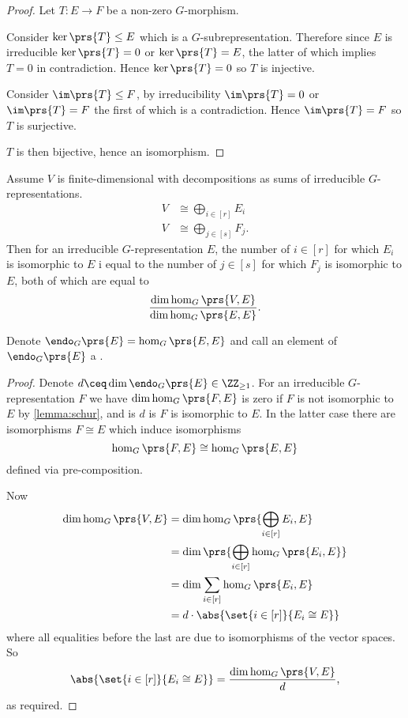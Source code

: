 \documentclass[10pt,a4paper,twoside,openany,hidelinks]{book}
\begin{document}
\begin{proof}
Let $T \colon E \to F$ be a non-zero $G$-morphism.

Consider $\ker\prs{T} \leq E$ which is a $G$-subrepresentation. Therefore since $E$ is irreducible $\ker\prs{T} = 0$ or $\ker\prs{T} = E$, the latter of which implies $T = 0$ in contradiction.
Hence $\ker\prs{T} = 0$ so $T$ is injective.

Consider $\im\prs{T} \leq F$, by irreducibility $\im\prs{T} = 0$ or $\im\prs{T} = F$ the first of which is a contradiction. Hence $\im\prs{T} = F$ so $T$ is surjective.

$T$ is then bijective, hence an isomorphism.
\end{proof}

\begin{claim}
Assume $V$ is finite-dimensional with decompositions as sums of irreducible $G$-representations.
\begin{align*}
V &\cong \bigoplus_{i \in [r]} E_i \\
V &\cong \bigoplus_{j \in [s]} F_j \text{.}
\end{align*}
Then for an irreducible $G$-representation $E$, the number of $i \in [r]$ for which $E_i$ is isomorphic to $E$ i equal to the number of $j \in [s]$ for which $F_j$ is isomorphic to $E$, both of which are equal to
\[\frac{\dim \hom_G\prs{V,E}}{\dim \hom_G\prs{E,E}} \text{.}\]
\end{claim}

\begin{definition}[$G$-endomorphism]
Denote $\endo_G\prs{E} = \hom_G\prs{E,E}$ and call an element of $\endo_G\prs{E}$ a .
\end{definition}

\begin{proof}
Denote $d \ceq \dim \endo_G\prs{E} \in \ZZ_{\geq 1}$.
For an irreducible $G$-representation $F$ we have $\dim \hom_G\prs{F,E}$ is zero if $F$ is not isomorphic to $E$ by \ref{lemma:schur}, and is $d$ is $F$ is isomorphic to $E$.
In the latter case there are isomorphisms $F \cong E$ which induce isomorphisms
\[\hom_G\prs{F,E} \cong \hom_G\prs{E,E}\]
defined via pre-composition.

Now
\begin{align*}
\dim \hom_G\prs{V,E} &= \dim \hom_G \prs{\bigoplus_{i \in [r]} E_i, E}
\\&=
\dim\prs{\bigoplus_{i \in [r]} \hom_G\prs{E_i, E}}
\\&=
\dim \sum_{i \in [r]} \hom_G\prs{E_i, E}
\\&=
d \cdot \abs{\set{i \in [r]}{E_i \cong E}}
\end{align*}
where all equalities before the last are due to isomorphisms of the vector spaces.
So
\[\abs{\set{i \in [r]}{E_i \cong E}} = \frac{\dim \hom_G\prs{V,E}}{d} \text{,}\]
as required.
\end{proof}
\end{document}
